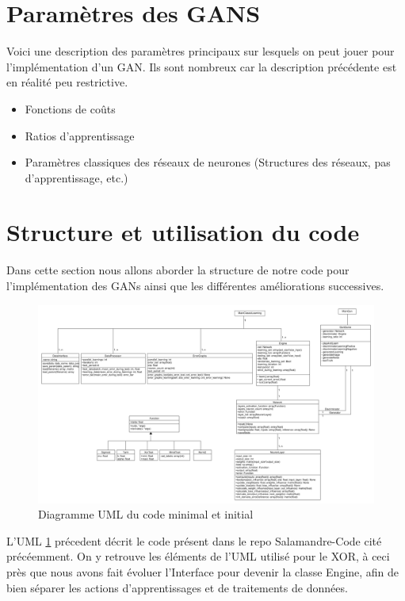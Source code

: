 \section{Paramètres des GANS}

	Voici une description des paramètres principaux sur lesquels on peut jouer pour l'implémentation d'un GAN. Ils sont nombreux car la description précédente est en réalité peu restrictive.

	\begin{itemize}
	 	\item Fonctions de coûts
	 	\item Ratios d'apprentissage
	 	\item Paramètres classiques des réseaux de neurones (Structures des réseaux, pas d'apprentissage, etc.)
	\end{itemize}


\section{Structure et utilisation du code}
	
	Dans cette section nous allons aborder la structure de notre code pour l'implémentation des GANs ainsi que les différentes améliorations successives. 

\begin{figure}[ht!]
  \includegraphics[width=\linewidth]{fig/uml_gan}
  \caption{Diagramme UML du code minimal et initial}
  \label{fig:uml_gan}
\end{figure}

L'UML \ref{fig:uml_gan} précedent décrit le code présent dans le repo Salamandre-Code cité précéemment. On y retrouve les éléments de l'UML utilisé pour le XOR, à ceci près que nous avons fait évoluer l'Interface pour devenir la classe Engine, afin de bien séparer les actions d'apprentissages et de traitements de données. 

